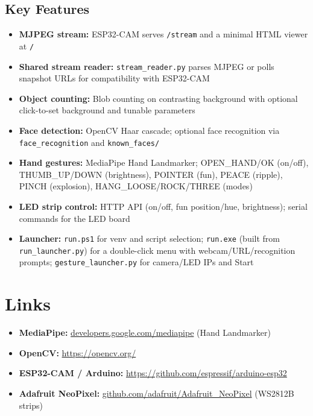 \documentclass[a4paper,12pt]{article}
\begin{document}
\subsection{Key Features}
\begin{itemize}
    \item \textbf{MJPEG stream:} ESP32-CAM serves \texttt{/stream} and a minimal HTML viewer at \texttt{/}
    \item \textbf{Shared stream reader:} \texttt{stream\_reader.py} parses MJPEG or polls snapshot URLs for compatibility with ESP32-CAM
    \item \textbf{Object counting:} Blob counting on contrasting background with optional click-to-set background and tunable parameters
    \item \textbf{Face detection:} OpenCV Haar cascade; optional face recognition via \texttt{face\_recognition} and \texttt{known\_faces/}
    \item \textbf{Hand gestures:} MediaPipe Hand Landmarker; OPEN\_HAND/OK (on/off), THUMB\_UP/DOWN (brightness), POINTER (fun), PEACE (ripple), PINCH (explosion), HANG\_LOOSE/ROCK/THREE (modes)
    \item \textbf{LED strip control:} HTTP API (on/off, fun position/hue, brightness); serial commands for the LED board
    \item \textbf{Launcher:} \texttt{run.ps1} for venv and script selection; \texttt{run.exe} (built from \texttt{run\_launcher.py}) for a double-click menu with webcam/URL/recognition prompts; \texttt{gesture\_launcher.py} for camera/LED IPs and Start
\end{itemize}

\section{Links}
\begin{itemize}
    \item \textbf{MediaPipe:} \href{https://developers.google.com/mediapipe}{developers.google.com/mediapipe} (Hand Landmarker)
    \item \textbf{OpenCV:} \href{https://opencv.org/}{https://opencv.org/}
    \item \textbf{ESP32-CAM / Arduino:} \href{https://github.com/espressif/arduino-esp32}{https://github.com/espressif/arduino-esp32}
    \item \textbf{Adafruit NeoPixel:} \href{https://github.com/adafruit/Adafruit\_NeoPixel}{github.com/adafruit/Adafruit\_NeoPixel} (WS2812B strips)
\end{itemize}
\end{document}
